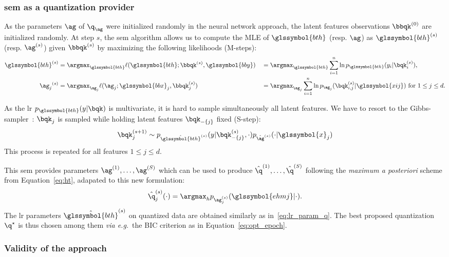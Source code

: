 \subsubsection{\gls{sem} as a quantization provider}

As the parameters $\ag$ of $\q_{\ag}$ were initialized randomly in the neural network approach, the latent features observations $\bbqk^{(0)}$ are initialized randomly. At step $s$, the \gls{sem} algorithm allows us to compute the MLE of $\glssymbol{bth}$ (resp. $\ag$) as ${\glssymbol{bth}}^{(s)}$ (resp. ${\ag}^{(s)}$) given $\bbqk^{(s)}$ by maximizing the following likelihoods (M-steps):
\begin{alignat}{2}
{\glssymbol{bth}}^{(s)} & = \argmax_{\glssymbol{bth}} \ell(\glssymbol{bth}; \bbqk^{(s)}, \glssymbol{bby}) && = \argmax_{\glssymbol{bth}} \sum_{i=1}^n \ln p_{\glssymbol{bth}}(y_i | \bqk^{(s)}_i), \nonumber \\
{\ag_j}^{(s)} & = \argmax_{\ag_j} \ell(\ag_j; \glssymbol{bbx}_j, \bbqk^{(s)}_j) && = \argmax_{\ag_j} \sum_{i=1}^n \ln p_{\ag_j}(\bqk^{(s)}_{i,j} | \glssymbol{xij}) \text{ for } 1 \leq j \leq d. \label{eq:mle_ag}
\end{alignat}

As the \gls{lr} $p_{\glssymbol{bth}}(y | \bqk)$ is multivariate, it is hard to sample simultaneously all latent features. We have to resort to the Gibbs-sampler~\cite{casella1992explaining}: $\bqk_j$ is sampled while holding latent features $\bqk_{-\{j\}}$ fixed (S-step):
\begin{equation} \label{eq:q_draw}
\bqk_j^{(s+1)} \sim p_{\hat{\glssymbol{bth}}^{(s)}}(y | \bqk_{-\{j\}}^{(s)}, \cdot) p_{\hat{\ag}^{(s)}}(\cdot | \glssymbol{x}_j)
\end{equation}
This process is repeated for all features $1 \leq j \leq d$.

This \gls{sem} provides parameters ${\ag}^{(1)}, \dots, {\ag}^{(S)}$ which can be used to produce $\hat{\q}^{(1)}, \dots, \hat{\q}^{(S)}$ following the \textit{maximum a posteriori} scheme from Equation~\eqref{eq:ht}, adapated to this new formulation:
\[ \hat{\q}_j^{(s)}(\cdot) = \argmax_{h} p_{\ag_j^{(s)}}(\glssymbol{ehmj} | \cdot ) .\]
The \gls{lr} parameters $\hat{\glssymbol{bth}}^{(s)}$ on quantized data are obtained similarly as in~\eqref{eq:lr_param_q}. The best proposed quantization $\q^\star$ is thus chosen among them \textit{via e.g.}\ the BIC criterion as in Equation~\eqref{eq:opt_epoch}.


\subsubsection{Validity of the approach}

